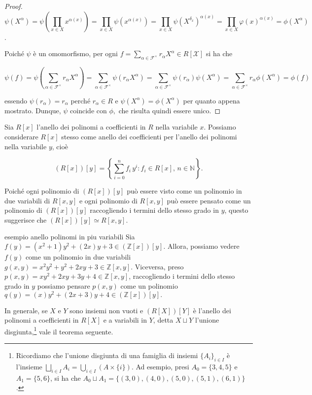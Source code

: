 \begin{proof}
	\[ \psi(X^\alpha) = 
	\psi\left( \prod\limits_{x \in X} x^{\alpha(x)} \right) = 
	\prod\limits_{x \in X} \psi\left(x^{\alpha(x)} \right) = 
	\prod\limits_{x \in X} \psi(X^{\delta_x})^{\alpha(x)} = 
	\prod\limits_{x \in X} \varphi(x)^{\alpha(x)} = 
	\phi(X^\alpha) \]. 
	
	\noindent Poiché $\psi$ è un omomorfismo, per ogni $f = \sum\limits_{\alpha \in \mathcal{F}^\times} r_\alpha X^\alpha \in R[\mathcal{X}]$ si ha che 
	
	\[ \psi(f) = 
	\psi\left(\sum\limits_{\alpha \in \mathcal{F}^\times} r_\alpha X^\alpha \right) = 
	\sum\limits_{\alpha \in \mathcal{F}^\times} \psi(r_\alpha X^\alpha) = 
	\sum\limits_{\alpha \in \mathcal{F}^\times} \psi(r_\alpha) \psi(X^\alpha) = 
	\sum\limits_{\alpha \in \mathcal{F}^\times} r_\alpha \phi(X^\alpha) = 
	\phi(f)\] 
	
	\noindent essendo $\psi(r_\alpha) = r_\alpha$ perché $r_\alpha \in R$ e $\psi(X^\alpha) = \phi(X^\alpha)$ per quanto appena mostrato. 
	Dunque, $\psi$ coincide con $\phi,$ che risulta quindi essere unico.
\end{proof}

\noindent Sia $R[x]$ l'anello dei polinomi a coefficienti in $R$ nella variabile $x.$ 
Possiamo considerare $R[x]$ stesso come anello dei coefficienti per l'anello dei polinomi nella variabile $y$, cioè 

\[(R[x])[y]=\left\{\sum\limits_{i=0}^n f_i\,y^i : f_i\in R[x],\, n\in \mathbb{N}\right\}.\] 

\noindent Poiché ogni polinomio di $(R[x])[y]$ può essere visto come un polinomio in due variabili di $R[x,y]$ e ogni polinomio di $R[x,y]$ 
può essere pensato come un polinomio di $(R[x])[y]$ raccogliendo i termini dello stesso grado in $y$, questo suggerisce che $(R[x])[y]\simeq R[x,y]$.

\begin{example}[]{esempio anello polinomi in piu variabili}
  Sia $f(y)=(x^2+1)y^2+(2x)y+3 \in (\mathbb{Z}[x])[y]$. Allora, possiamo vedere $f(y)$ come un polinomio in due variabili 
  $g(x,y)=x^2y^2+y^2+2xy+3 \in \mathbb{Z}[x,y]$. Viceversa, preso $p(x,y)=xy^2+2xy+3y+4\in \mathbb{Z}[x,y]$, 
  raccogliendo i termini dello stesso grado in $y$ possiamo pensare $p(x,y)$ come un polinomio $q(y)=(x)y^2+(2x+3)y+4 \in (\mathbb{Z}[x])[y].$
\end{example}

\noindent In generale, se $X$ e $Y$ sono insiemi non vuoti e $(R[X])[Y]$ è l'anello dei polinomi a coefficienti in $R[X]$ e a variabili in $Y$, 
detta $X \sqcup Y$ l'unione disgiunta,\footnote{Ricordiamo che l'unione disgiunta di una famiglia di insiemi $\{A_i\}_{i\in I}$ è l'insieme 
$\bigsqcup\limits_{i\in I} A_i = \bigcup\limits_{i\in I} (A \times \{i\})$. Ad esempio, presi $A_0=\{3,4,5\}$ e $A_1=\{5,6\}$, 
si ha che $A_0 \sqcup A_1=\{(3,0), (4,0), (5,0), (5,1), (6,1)\}$.} vale il teorema seguente.

